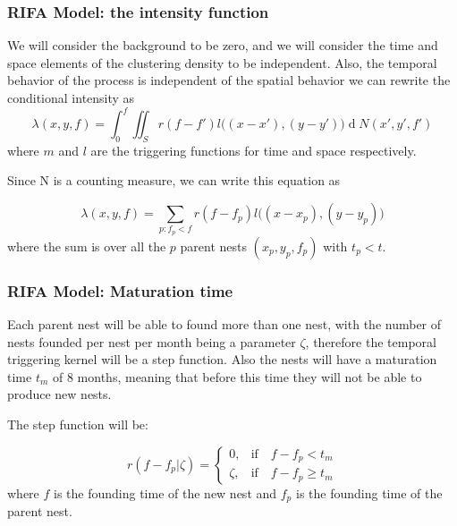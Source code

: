 \documentclass[9pt, xcolor={dvipsnames,svgnames,table}]{beamer}
\renewcommand{\d}[1]{\ensuremath{\operatorname{d}\!{#1}}}
\begin{document}
\begin{frame}
\frametitle{RIFA Model: the intensity function}
    We will consider the background to be zero, and we will consider the time and space elements of the clustering density to be independent.
    Also, the temporal behavior of the process is independent of the spatial behavior we can rewrite the conditional intensity as
    \begin{equation*}
        \lambda(x, y, f) = \int_{0}^{f} \iint_{S} r(f-f') l\Big((x - x'), (y - y')\Big) \d N(x', y', f')
    \end{equation*}
    where $m$ and $l$ are the triggering functions for time and space respectively.

    Since N is a counting measure, we can write this equation as

    \begin{equation*}
        \lambda(x, y, f) = \sum_{ p: f_p < f } r(f - f_p) l \Big((x - x_p),(y - y_p) \Big)
    \end{equation*}
    where the sum is over all the $p$ parent nests $(x_p, y_p, f_p)$ with $t_p < t$.
\end{frame}

\begin{frame}
\frametitle{RIFA Model: Maturation time}
    Each parent nest will be able to found more than one nest, with the number of nests founded per nest per month being a parameter $\zeta$, therefore the temporal triggering kernel will be a step function. Also the nests will have a maturation time $t_m$ of 8 months, meaning that before this time they will not be able to produce new nests. 

    The step function will be:

    \begin{equation*}
        r (f - f_p | \zeta) =
        \begin{cases}
            0, & \mbox{if} \quad f - f_p < t_{m} \\
            \zeta, & \mbox{if} \quad f - f_p \geq t_{m}
        \end{cases}
    \end{equation*}
    where $f$ is the founding time of the new nest and $f_p$ is the founding time of the parent nest.
\end{frame}
\end{document}
